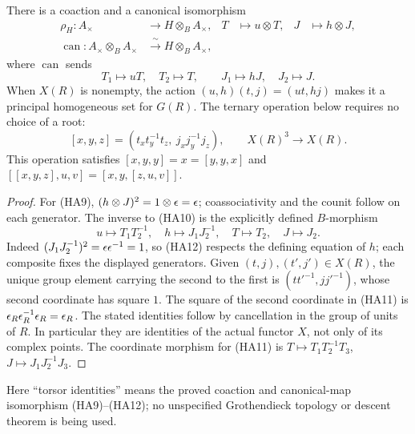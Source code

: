 \begin{theorem}
There is a coaction and a canonical isomorphism
\begin{align}
 \rho_H:A_\times&\longrightarrow H\otimes_B A_\times,
 &T&\longmapsto u\otimes T,&J&\longmapsto h\otimes J,
 \tag{HA9}\\
 \operatorname{can}:A_\times\otimes_B A_\times
   &\xrightarrow{\ \sim\ } H\otimes_B A_\times,
 &&&&\tag{HA10}
\end{align}
where $\operatorname{can}$ sends
\[
 T_1\mapsto uT,\quad T_2\mapsto T,
 \qquad J_1\mapsto hJ,\quad J_2\mapsto J.
\]
When $X(R)$ is nonempty, the action
$(u,h)(t,j)=(ut,hj)$ makes it a principal homogeneous set for $G(R)$.
The ternary operation below requires no choice of a root:
\begin{equation}\tag{HA11}
 [x,y,z]=(t_x t_y^{-1}t_z,\ j_x j_y^{-1}j_z),
 \qquad X(R)^3\longrightarrow X(R).
\end{equation}
This operation satisfies $[x,y,y]=x=[y,y,x]$ and
$[[x,y,z],u,v]=[x,y,[z,u,v]]$.
\end{theorem}
\begin{proof}
For (HA9), $(h\otimes J)^2=1\otimes\epsilon=\epsilon$;
coassociativity and the counit follow on each generator.
The inverse to (HA10) is the explicitly defined $B$-morphism
\begin{equation}\tag{HA12}
 u\longmapsto T_1T_2^{-1},\quad
 h\longmapsto J_1J_2^{-1},\quad
 T\longmapsto T_2,\quad J\longmapsto J_2.
\end{equation}
Indeed $(J_1J_2^{-1})^2=\epsilon\epsilon^{-1}=1$, so (HA12)
respects the defining equation of $h$; each composite fixes the displayed
generators. Given $(t,j),(t',j')\in X(R)$, the unique group element
carrying the second to the first is
$(tt'^{-1},jj'^{-1})$, whose second coordinate has square $1$.
The square of the second coordinate in (HA11) is
$\epsilon_R\epsilon_R^{-1}\epsilon_R=\epsilon_R$.
The stated identities follow by cancellation in the group of units of
$R$. In particular they are identities of the actual functor $X$, not
only of its complex points. The coordinate morphism for (HA11) is
$T\mapsto T_1T_2^{-1}T_3$, $J\mapsto J_1J_2^{-1}J_3$.
\end{proof}

Here ``torsor identities'' means the proved coaction and canonical-map
isomorphism (HA9)--(HA12); no unspecified Grothendieck topology or
descent theorem is being used.

